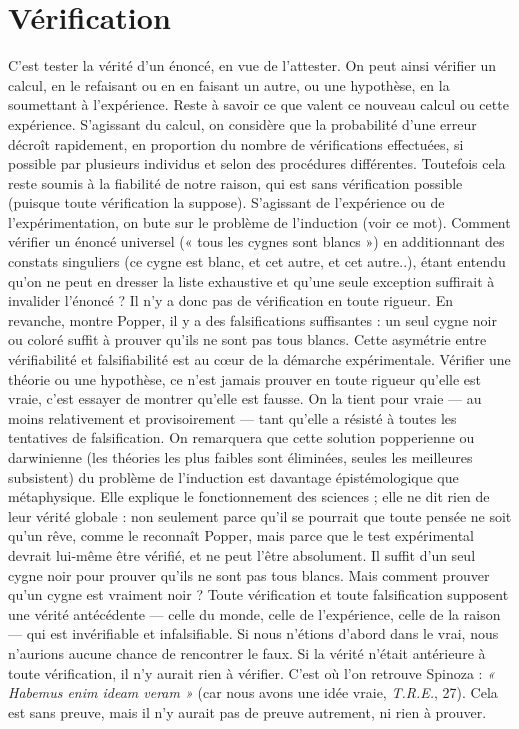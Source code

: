 \section{Vérification}
C’est tester la vérité d’un énoncé, en vue de l’attester. On
peut ainsi vérifier un calcul, en le refaisant ou en en faisant
un autre, ou une hypothèse, en la soumettant à l'expérience. Reste à savoir ce
que valent ce nouveau calcul ou cette expérience. S'agissant du calcul, on considère
que la probabilité d’une erreur décroît rapidement, en proportion du
nombre de vérifications effectuées, si possible par plusieurs individus et selon
des procédures différentes. Toutefois cela reste soumis à la fiabilité de notre
raison, qui est sans vérification possible (puisque toute vérification la suppose).
S'agissant de l'expérience ou de l’expérimentation, on bute sur le problème de
l'induction (voir ce mot). Comment vérifier un énoncé universel (« tous les
cygnes sont blancs ») en additionnant des constats singuliers (ce cygne est
blanc, et cet autre, et cet autre..), étant entendu qu’on ne peut en dresser la
liste exhaustive et qu’une seule exception suffirait à invalider l'énoncé ? Il n’y a
donc pas de vérification en toute rigueur. En revanche, montre Popper, il y a
des falsifications suffisantes : un seul cygne noir ou coloré suffit à prouver qu’ils
ne sont pas tous blancs. Cette asymétrie entre vérifiabilité et falsifiabilité est au
cœur de la démarche expérimentale. Vérifier une théorie ou une hypothèse, ce
n’est jamais prouver en toute rigueur qu’elle est vraie, c’est essayer de montrer
qu’elle est fausse. On la tient pour vraie — au moins relativement et provisoirement
— tant qu'elle a résisté à toutes les tentatives de falsification. On remarquera
que cette solution popperienne ou darwinienne (les théories les plus
faibles sont éliminées, seules les meilleures subsistent) du problème de l’induction
est davantage épistémologique que métaphysique. Elle explique le fonctionnement
des sciences ; elle ne dit rien de leur vérité globale : non seulement
parce qu’il se pourrait que toute pensée ne soit qu’un rêve, comme le reconnaît
Popper, mais parce que le test expérimental devrait lui-même être vérifié, et ne
peut l’être absolument. Il suffit d’un seul cygne noir pour prouver qu’ils ne
sont pas tous blancs. Mais comment prouver qu’un cygne est vraiment noir ?
Toute vérification et toute falsification supposent une vérité antécédente — celle
du monde, celle de l'expérience, celle de la raison — qui est invérifiable et infalsifiable.
Si nous n’étions d’abord dans le vrai, nous n’aurions aucune chance de
rencontrer le faux. Si la vérité n’était antérieure à toute vérification, il n’y aurait
rien à vérifier. C’est où l’on retrouve Spinoza : {\it « Habemus enim ideam veram »}
(car nous avons une idée vraie, {\it T.R.E.}, 27). Cela est sans preuve, mais il n’y
aurait pas de preuve autrement, ni rien à prouver.

